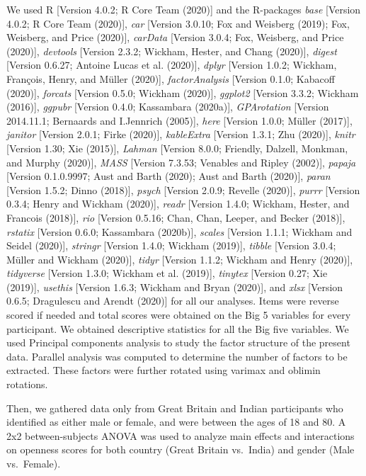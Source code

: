 \documentclass[
  english,
  man, fleqn, noextraspace]{apa6}
\begin{document}
We used R {[}Version 4.0.2; R Core Team (2020){]} and the R-packages \emph{base} {[}Version 4.0.2; R Core Team (2020){]}, \emph{car} {[}Version 3.0.10; Fox and Weisberg (2019); Fox, Weisberg, and Price (2020){]}, \emph{carData} {[}Version 3.0.4; Fox, Weisberg, and Price (2020){]}, \emph{devtools} {[}Version 2.3.2; Wickham, Hester, and Chang (2020){]}, \emph{digest} {[}Version 0.6.27; Antoine Lucas et al. (2020){]}, \emph{dplyr} {[}Version 1.0.2; Wickham, François, Henry, and Müller (2020){]}, \emph{factorAnalysis} {[}Version 0.1.0; Kabacoff (2020){]}, \emph{forcats} {[}Version 0.5.0; Wickham (2020){]}, \emph{ggplot2} {[}Version 3.3.2; Wickham (2016){]}, \emph{ggpubr} {[}Version 0.4.0; Kassambara (2020a){]}, \emph{GPArotation} {[}Version 2014.11.1; Bernaards and I.Jennrich (2005){]}, \emph{here} {[}Version 1.0.0; Müller (2017){]}, \emph{janitor} {[}Version 2.0.1; Firke (2020){]}, \emph{kableExtra} {[}Version 1.3.1; Zhu (2020){]}, \emph{knitr} {[}Version 1.30; Xie (2015){]}, \emph{Lahman} {[}Version 8.0.0; Friendly, Dalzell, Monkman, and Murphy (2020){]}, \emph{MASS} {[}Version 7.3.53; Venables and Ripley (2002){]}, \emph{papaja} {[}Version 0.1.0.9997; Aust and Barth (2020); Aust and Barth (2020){]}, \emph{paran} {[}Version 1.5.2; Dinno (2018){]}, \emph{psych} {[}Version 2.0.9; Revelle (2020){]}, \emph{purrr} {[}Version 0.3.4; Henry and Wickham (2020){]}, \emph{readr} {[}Version 1.4.0; Wickham, Hester, and Francois (2018){]}, \emph{rio} {[}Version 0.5.16; Chan, Chan, Leeper, and Becker (2018){]}, \emph{rstatix} {[}Version 0.6.0; Kassambara (2020b){]}, \emph{scales} {[}Version 1.1.1; Wickham and Seidel (2020){]}, \emph{stringr} {[}Version 1.4.0; Wickham (2019){]}, \emph{tibble} {[}Version 3.0.4; Müller and Wickham (2020){]}, \emph{tidyr} {[}Version 1.1.2; Wickham and Henry (2020){]}, \emph{tidyverse} {[}Version 1.3.0; Wickham et al. (2019){]}, \emph{tinytex} {[}Version 0.27; Xie (2019){]}, \emph{usethis} {[}Version 1.6.3; Wickham and Bryan (2020){]}, and \emph{xlsx} {[}Version 0.6.5; Dragulescu and Arendt (2020){]} for all our analyses. Items were reverse scored if needed and total scores were obtained on the Big 5 variables for every participant. We obtained descriptive statistics for all the Big five variables. We used Principal components analysis to study the factor structure of the present data. Parallel analysis was computed to determine the number of factors to be extracted. These factors were further rotated using varimax and oblimin rotations.

Then, we gathered data only from Great Britain and Indian participants who identified as either male or female, and were between the ages of 18 and 80. A 2x2 between-subjects ANOVA was used to analyze main effects and interactions on openness scores for both country (Great Britain vs.~India) and gender (Male vs.~Female).
\end{document}
